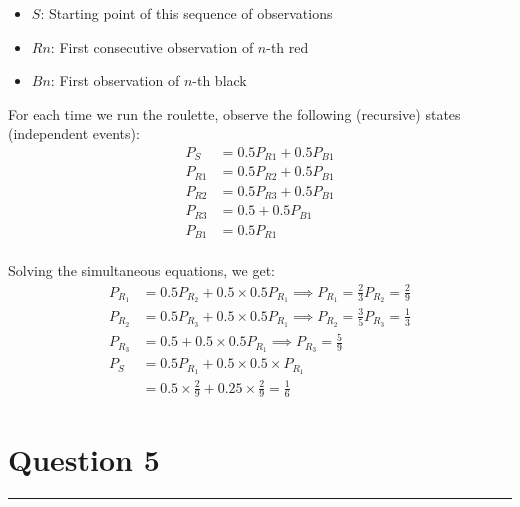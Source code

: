 \documentclass{article}
\begin{document}
\begin{enumerate}[label=(\alph*)]
          \begin{itemize}
              \item $S$: Starting point of this sequence of observations
              \item $Rn$: First consecutive observation of $n$-th red
              \item $Bn$: First observation of $n$-th black
          \end{itemize}
          For each time we run the roulette, observe the following (recursive) states (independent events):
          \begin{align*}
              P_S    & = 0.5P_{R1} + 0.5P_{B1} \\
              P_{R1} & = 0.5P_{R2} + 0.5P_{B1} \\
              P_{R2} & = 0.5P_{R3} + 0.5P_{B1} \\
              P_{R3} & = 0.5 + 0.5P_{B1}       \\
              P_{B1} & = 0.5P_{R1}             \\
          \end{align*}

          Solving the simultaneous equations, we get:
          \begin{align*}
              P_{R_1} & = 0.5P_{R_2} + 0.5\times0.5P_{R_1} \implies P_{R_1}=\frac23P_{R_2}=\frac29 \\
              P_{R_2} & = 0.5P_{R_3} + 0.5\times0.5P_{R_1} \implies P_{R_2}=\frac35P_{R_3}=\frac13 \\
              P_{R_3} & = 0.5 + 0.5\times0.5P_{R_1} \implies P_{R_3}=\frac59                       \\
              P_S     & = 0.5P_{R_1} + 0.5\times0.5 \times P_{R_1}                                 \\
                      & = 0.5\times\frac29 + 0.25\times\frac29 = \frac16
          \end{align*}
\end{enumerate}

\newpage
\section*{Question 5}
\hrule
\vspace{0.5cm}
\end{document}
